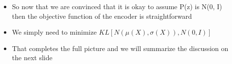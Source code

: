 \documentclass[serif,aspectratio=169,dvipsnames]{beamer}
\begin{document}
\begin{frame}
\begin{columns}
\begin{overlayarea}{\textwidth}{\textheight}
		\end{overlayarea}
		\begin{overlayarea}{\textwidth}{\textheight}
			\begin{itemize}\justifying
				\item<1-> So now that we are convinced that it is okay to assume P(z) is N(0, I) then the objective function of the encoder is straightforward
				\item<2-> We simply need to minimize $KL[N(\mu(X), \sigma(X)), N(0, I)]$
				\item<3-> That completes the full picture and we will summarize the discussion on the next slide
			\end{itemize}
		\end{overlayarea}
	\end{columns}
\end{frame}
\end{document}
